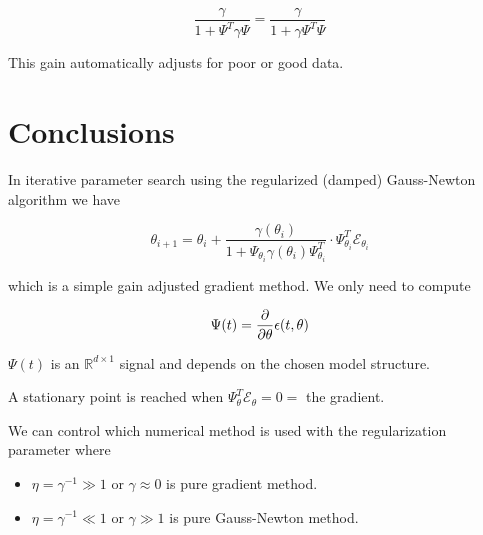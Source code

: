 \begin{equation*}
\frac{\gamma}{1+\Psi^T\gamma\Psi} = \frac{\gamma}{1+\gamma\Psi^T\Psi}
\end{equation*}

This gain automatically adjusts for poor or good data.

\section{Conclusions}
In iterative parameter search using the regularized (damped) Gauss-Newton algorithm we have

\begin{equation*}
\theta_{i+1} = \theta_i + \frac{\gamma(\theta_i)}{1+\Psi_{\theta_i}\gamma(\theta_i)\Psi_{\theta_i}^T}\cdot \Psi_{\theta_i}^T\mathcal{E}_{\theta_i}
\end{equation*}

which is a simple gain adjusted gradient method.
We only need to compute

\begin{equation*}
\Psi(t) = \frac{\partial}{\partial\theta}\epsilon(t,\theta)
\end{equation*}

$\Psi(t)$ is an $\mathbb{R}^{d\times1}$ signal and depends on the chosen model structure.

A stationary point is reached when $\Psi_\theta^T\mathcal{E}_\theta=0=$ the gradient.

We can control which numerical method is used with the regularization parameter where
\begin{itemize}
\item $\eta = \gamma^{-1} \gg 1$ or $\gamma\approx0$ is pure gradient method.
\item $\eta = \gamma^{-1} \ll 1$ or $\gamma\gg1$ is pure Gauss-Newton method.
\end{itemize}
